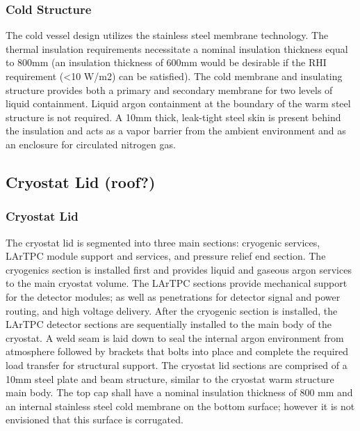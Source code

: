 \subsubsection{Cold Structure}
The cold vessel design utilizes the stainless steel membrane technology. The thermal insulation requirements necessitate a nominal insulation thickness equal to 800mm (an insulation thickness of 600mm would be desirable if the RHI requirement (<10 W/m2) can be satisfied).  The cold membrane and insulating structure provides both a primary and secondary membrane for two levels of liquid containment.  Liquid argon containment at the boundary of the warm steel structure is not required.  A 10mm thick, leak-tight steel skin is present behind the insulation and acts as a vapor barrier from the ambient environment and as an enclosure for circulated nitrogen gas.


\subsection{Cryostat Lid (roof?)}
\label{sec:cryost-des-lid}
\subsubsection{Cryostat Lid}
The cryostat lid is segmented into three main sections: cryogenic services, LArTPC module support and services, and pressure relief end section.  The cryogenics section is installed first and provides liquid and gaseous argon services to the main cryostat volume.  The LArTPC sections provide mechanical support for the detector modules; as well as penetrations for detector signal and power routing, and high voltage delivery.  After the cryogenic section is installed, the LArTPC detector sections are sequentially installed to the main body of the cryostat.  A weld seam is laid down to seal the internal argon environment from atmosphere followed by brackets that bolts into place and complete the required load transfer for structural support.  The cryostat lid sections are comprised of a 10mm steel plate and beam structure, similar to the cryostat warm structure main body.  The top cap shall have a nominal insulation thickness of 800 mm and an internal stainless steel cold membrane on the bottom surface; however it is not envisioned that this surface is corrugated.

